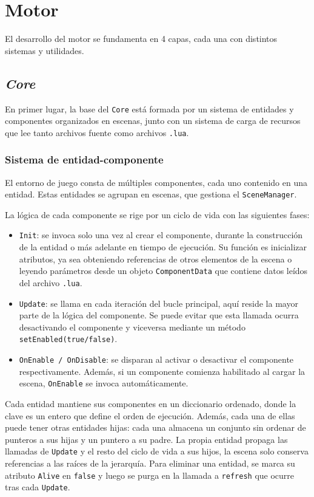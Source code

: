 \chapter{Motor}
\label{cap:motor}

El desarrollo del motor se fundamenta en 4 capas, cada una con distintos sistemas y utilidades. 

\section{\textit{Core}}
En primer lugar, la base del \texttt{Core} está formada por un sistema de entidades y componentes organizados en escenas, junto con un sistema de carga de recursos que lee tanto archivos fuente como archivos \texttt{.lua}.

\subsection{Sistema de entidad-componente}
El entorno de juego consta de múltiples componentes, cada uno contenido en una entidad. Estas entidades se agrupan en escenas, que gestiona el \texttt{SceneManager}.

\smallskip

La lógica de cada componente se rige por un ciclo de vida con las siguientes fases: 

\begin{itemize}
	\item \texttt{Init}: se invoca solo una vez al crear el componente, durante la construcción de la entidad o más adelante en tiempo de ejecución. Su función es inicializar atributos, ya sea obteniendo referencias de otros elementos de la escena o leyendo parámetros desde un objeto \texttt{ComponentData} que contiene datos leídos del archivo \texttt{.lua}.
	\item \texttt{Update}: se llama en cada iteración del bucle principal, aquí reside la mayor parte de la lógica del componente. Se puede evitar que esta llamada ocurra desactivando el componente y viceversa mediante un método \texttt{setEnabled(true/false)}.
	\item \texttt{OnEnable / OnDisable}: se disparan al activar o desactivar el componente respectivamente. Además, si un componente comienza habilitado al cargar la escena, \texttt{OnEnable} se invoca automáticamente.
\end{itemize}

\medskip

Cada entidad mantiene sus componentes en un diccionario ordenado, donde la clave es un entero que define el orden de ejecución. Además, cada una de ellas puede tener otras entidades hijas: cada una almacena un conjunto sin ordenar de punteros a sus hijas y un puntero a su padre. La propia entidad propaga las llamadas de \texttt{Update} y el resto del ciclo de vida a sus hijos, la escena solo conserva referencias a las raíces de la jerarquía. Para eliminar una entidad, se marca su atributo \texttt{Alive} en \texttt{false} y luego se purga en la llamada a \texttt{refresh} que ocurre tras cada \texttt{Update}.

